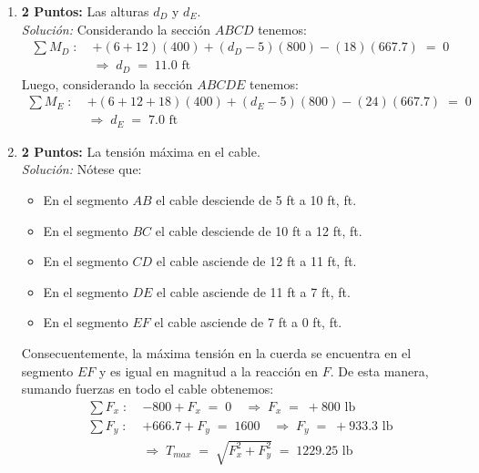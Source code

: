 \documentclass[ a4paper, twoside, 11pt]{article}
\begin{document}
\begin{problem}
\begin{enumerate}[label=\textbf{\alph*)}]
\item \textbf{2 Puntos:} Las alturas $d_D$ y $d_E$. \\[1ex] \emph{Soluci\'on:} Considerando la secci\'on $ABCD$ tenemos: 
\begin{align*}
\sum M_D \; \colon \;
& +(6+12)(400) + ( d_D - 5)(800) - (18)(667.7) \; = \; 0 \\[1ex]
& \Longrightarrow \;
d_D \; = \; 11.0 \text{ ft}
\end{align*}
Luego, considerando la secci\'on $ABCDE$ tenemos: 
\begin{align*}
\sum M_E \; \colon \;
& +(6+12+18)(400) + ( d_E - 5)(800) - (24)(667.7) \; = \; 0 \\[1ex]
& \Longrightarrow \;
d_E \; = \; 7.0 \text{ ft}
\end{align*}

\item \textbf{2 Puntos:} La tensi\'on m\'axima en el cable. \\[1ex] \emph{Soluci\'on:} N\'otese que: 
\begin{itemize}
\item En el segmento $AB$ el cable desciende de 5 ft a 10 ft,  ft. 
\item En el segmento $BC$ el cable desciende de 10 ft a 12 ft,  ft. 
\item En el segmento $CD$ el cable asciende de 12 ft a 11 ft,  ft. 
\item En el segmento $DE$ el cable asciende de 11 ft a 7 ft,  ft. 
\item En el segmento $EF$ el cable asciende de 7 ft a 0 ft,  ft. 
\end{itemize}
Consecuentemente, la m\'axima tensi\'on en la cuerda se encuentra en el segmento $EF$ y es igual en magnitud a la reacci\'on en $F$. De esta manera, sumando fuerzas en todo el cable obtenemos: 
\begin{align*}
\sum F_x \; \colon \; & -800 + F_x \; = \; 0 \quad
\Longrightarrow \; F_x \; = \; +800 \text{ lb} \\[1ex]
\sum F_y \; \colon \; & +666.7 + F_y \; = \; 1600 \quad
\Longrightarrow \; F_y \; = \; +933.3 \text{ lb} \\[1ex]
& \Longrightarrow \;
T_{max} \; = \; \sqrt{F_x^2 + F_y^2} \; = \; 1229.25 \text{ lb}
\end{align*}

\end{enumerate}

\end{problem}
\fullskip
\end{document}
